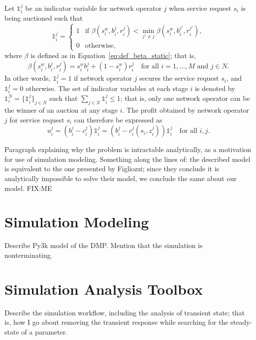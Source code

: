 Let $\mathds{1}^j_i$ be an indicator variable for network operator $j$ when service request $s_i$ is being auctioned such that
\begin{equation}
  \label{eq:indicator_function_dynamic}
  \mathds{1}^j_i = \left\{
  \begin{array}{ll}
    1 &\text{if } \beta(s^w_i,b^j_i,r^j_i) < \displaystyle\min_{j'\neq j} \beta(s^w_i,b^{j'}_i,r^{j'}_i),\\
    0 &\text{otherwise},
  \end{array}\right.
\end{equation}
where $\beta$ is defined as in Equation~\eqref{eq:def_beta_static}; that is,
\begin{equation}
  \label{eq:def_beta_dynamic}
  \beta(s^w_i,b^j_i,r^j_i) = s^w_i b^j_i + (1-s^w_i) r^j_i \quad\text{for all } i=1,\ldots,M \text{ and }j\in N.
\end{equation}
In other words, $\mathds{1}^j_i = 1$ if network operator $j$ secures the service request $s_i$, and $\mathds{1}^j_i = 0$ otherwise. The set of indicator variables at each stage $i$ is denoted by $\mathds{1}^N_i=\{\mathds{1}^j_i\}_{j\in N}$ such that $\sum_{j\in N}\mathds{1}^j_i\le 1$; that is, only one network operator can be the winner of an auction at any stage $i$. The profit obtained by network operator $j$ for service request $s_i$ can therefore be expressed as
\begin{equation}
  \label{eq:def_no_profit_dynamic}
  u^j_i = \left(b^j_i - c^j_i\right)\mathds{1}^j_i = \left(b^j_i - c^j_i(s_i, z^j_i)\right)\mathds{1}^j_i \quad\text{for all }i,j.
\end{equation}

Paragraph explaining why the problem is intractable analytically, as a motivation for use of simulation modeling. Something along the lines of: the described model is equivalent to the one presented by Figliozzi; since they conclude it is analytically impossible to solve their model, we conclude the same about our model. FIX:ME 

\section{Simulation Modeling} %
\label{sec:simulation_modeling_dynamic}
Describe Py3k model of the DMP. Mention that the simulation is nonterminating.

\section{Simulation Analysis Toolbox} %
\label{sec:simulation_analysis_toolbox_dynamic}
Describe the simulation workflow, including the analysis of transient state; that is, how I go about removing the transient response while searching for the steady-state of a parameter.

